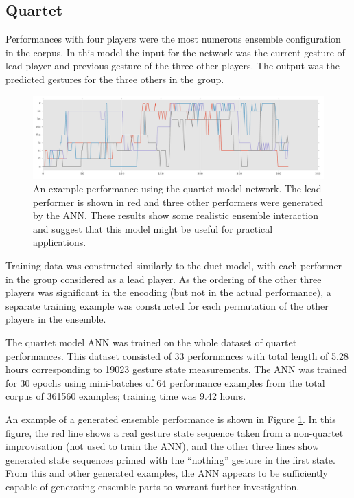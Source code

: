 \documentclass{article}
\begin{document}
\subsection{Quartet}

Performances with four players were the most numerous ensemble
configuration in the corpus. In this model the input for the network
was the current gesture of lead player and previous gesture of the
three other players. The output was the predicted gestures for the
three others in the group.

\begin{figure}
  \centering
  \includegraphics[width=\textwidth]{quartet-performance-512nodes-16}
  \caption{An example performance using the quartet model network. The
    lead performer is shown in red and three other performers were
    generated by the ANN. These results show some realistic ensemble
    interaction and suggest that this model might be useful for
    practical applications.}\label{fig:quartet-model}
\end{figure}

Training data was constructed similarly to the duet model, with each
performer in the group considered as a lead player. As the ordering of
the other three players was significant in the encoding (but not in
the actual performance), a separate training example was constructed
for each permutation of the other players in the ensemble.

The quartet model ANN was trained on the whole dataset of quartet
performances. This dataset consisted of 33 performances with total
length of 5.28 hours corresponding to 19023 gesture state
measurements. The ANN was trained for 30 epochs using mini-batches of
64 performance examples from the total corpus of 361560 examples;
training time was 9.42 hours.

An example of a generated ensemble performance is shown in Figure
\ref{fig:quartet-model}. In this figure, the red line shows a real
gesture state sequence taken from a non-quartet improvisation (not
used to train the ANN), and the other three lines show generated state
sequences primed with the ``nothing'' gesture in the first state. From
this and other generated examples, the ANN appears to be sufficiently
capable of generating ensemble parts to warrant further investigation.
\end{document}
